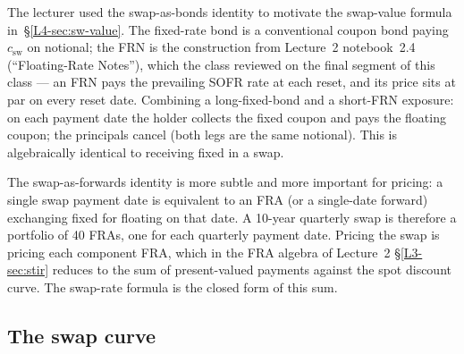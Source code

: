 The lecturer used the swap-as-bonds identity to motivate the swap-value
formula in~\S\ref{L4-sec:sw-value}. The fixed-rate bond is a conventional
coupon bond paying $c_{\text{sw}}$ on notional; the FRN is the
construction from Lecture~2 notebook~2.4 (``Floating-Rate Notes''), which
the class reviewed on the final segment of this class --- an FRN pays the
prevailing SOFR rate at each reset, and its price sits at par on every
reset date. Combining a long-fixed-bond and a short-FRN exposure: on each
payment date the holder collects the fixed coupon and pays the floating
coupon; the principals cancel (both legs are the same notional). This is
algebraically identical to receiving fixed in a swap.

The swap-as-forwards identity is more subtle and more important for
pricing: a single swap payment date is equivalent to an FRA (or a
single-date forward) exchanging fixed for floating on that date. A
10-year quarterly swap is therefore a portfolio of 40 FRAs, one for each
quarterly payment date. Pricing the swap is pricing each component FRA,
which in the FRA algebra of Lecture~2 \S\ref{L3-sec:stir} reduces to the
sum of present-valued payments against the spot discount curve. The
swap-rate formula is the closed form of this sum.

\subsection{The swap curve}\label{L4-sec:sw-curve}

